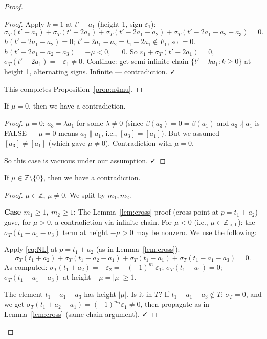 \begin{proof}
\begin{proof}
Apply $k=1$ at $t'-a_1$ (height 1, sign $\varepsilon_1$):
\[
  \sigma_T(t'-a_1)+\sigma_T(t'-2a_1)+\sigma_T(t'-2a_1-a_2)+\sigma_T(t'-2a_1-a_2-a_3)=0.
\]
$h(t'-2a_1-a_2)=0$; $t'-2a_1-a_2=t_1-2a_1\notin F_1$, so $=0$. $h(t'-2a_1-a_2-a_3)=-\mu<0$, $=0$. So $\varepsilon_1+\sigma_T(t'-2a_1)=0$, $\sigma_T(t'-2a_1)=-\varepsilon_1\neq 0$. Continue: get semi-infinite chain $\{t'-ka_1:k\geq 0\}$ at height 1, alternating signs. Infinite — contradiction. ✓

This completes Proposition~\ref{prop:n4mu}.
\end{proof}

\bigskip

\begin{proposition}[n4mu0: $\mu = 0$]\label{prop:n4mu0}
If $\mu = 0$, then we have a contradiction.
\end{proposition}
\begin{proof}
$\mu=0$: $a_3 = \lambda a_1$ for some $\lambda \neq 0$ (since $\beta(a_3)=0=\beta(a_1)$ and $a_3\not\parallel a_1$ is FALSE — $\mu=0$ means $a_3\parallel a_1$, i.e., $[a_3]=[a_1]$). But we assumed $[a_3]\neq[a_1]$ (which gave $\mu\neq 0$). Contradiction with $\mu=0$.

So this case is vacuous under our assumption. ✓
\end{proof}

\bigskip

\begin{proposition}\label{prop:n4muZ}
If $\mu \in \mathbb{Z} \setminus \{0\}$, then we have a contradiction.
\end{proposition}
\begin{proof}
$\mu \in \mathbb{Z}$, $\mu \neq 0$. We split by $m_1, m_2$.

\textbf{Case $m_1\geq 1$, $m_2\geq 1$:} The Lemma~\ref{lem:cross} proof (cross-point at $p=t_1+a_2$) gave, for $\mu>0$, a contradiction via infinite chain. For $\mu<0$ (i.e., $\mu\in\mathbb{Z}_{<0}$): the $\sigma_T(t_1-a_1-a_3)$ term at height $-\mu>0$ may be nonzero. We use the following:

Apply \eqref{eq:NL} at $p=t_1+a_2$ (as in Lemma~\ref{lem:cross}):
\[
  \sigma_T(t_1+a_2)+\sigma_T(t_1+a_2-a_1)+\sigma_T(t_1-a_1)+\sigma_T(t_1-a_1-a_3)=0.
\]
As computed: $\sigma_T(t_1+a_2)=-\varepsilon_2 = -(-1)^{m_1}\varepsilon_1$; $\sigma_T(t_1-a_1)=0$; $\sigma_T(t_1-a_1-a_3)$ at height $-\mu=|\mu|\geq 1$.

The element $t_1-a_1-a_3$ has height $|\mu|$. Is it in $T$? If $t_1-a_1-a_3 \notin T$: $\sigma_T=0$, and we get $\sigma_T(t_1+a_2-a_1)=(-1)^{m_1}\varepsilon_1\neq 0$, then propagate as in Lemma~\ref{lem:cross} (same chain argument). ✓


\end{proof}
\end{proof}
